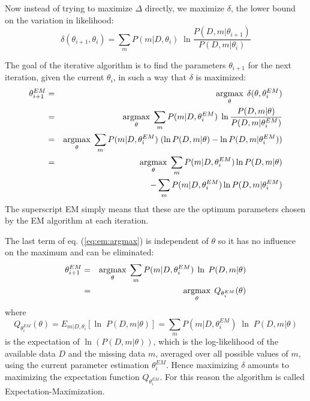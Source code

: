 Now instead of trying to maximize $\Delta$ directly, we maximize $\delta$, the lower bound on the variation in likelihood:
\begin{equation}
\delta(\theta_{i+1}, \theta_i) = \sum_m P(m|D, \theta_i) \; 
                           \ln \frac{P(D,m|\theta_{i+1})}{P(D,m|\theta_i)}
\label{eq:deltaEM}
\end{equation}

The goal of the iterative algorithm is to find the parameters $\theta_{i+1}$ for the next iteration, given the current $\theta_i$, in such a way that $\delta$ is maximized:
\begin{eqnarray}
\theta_{i+1}^{EM} & = & 
     \argmax_\theta \; \delta(\theta, \theta_i^{EM}) \nonumber \\
     & = & \argmax_\theta \; \sum_m P(m|D, \theta_i^{EM}) \; 
                           \ln \frac{P(D,m|\theta)}{P(D,m|\theta_i^{EM})}
\\
     & = & \argmax_\theta \; \sum_m P(m|D, \theta_i^{EM}) \; 
                           ( \ln P(D,m|\theta) - \ln P(D,m|\theta_i^{EM} ) )
\\
     & = & \argmax_\theta \; 
\sum_m P(m|D, \theta_i^{EM}) \ln P(D,m|\theta) 
\nonumber \\
&& \quad \quad \quad 
- \sum_m P(m|D, \theta_i^{EM}) \ln P(D,m|\theta_i^{EM})
\label{eq:em:argmax}
\end{eqnarray}
The superscript EM simply means that these are the optimum parameters chosen by the EM algorithm at each iteration.

The last term of eq. (\ref{eq:em:argmax}) is independent of $\theta$ so it has no influence on the maximum and can be eliminated:
\begin{eqnarray}
\theta_{i+1}^{EM} & = & 
   \argmax_\theta \; \sum_m P(m|D, \theta_i^{EM}) \; 
   \ln \; P(D,m|\theta) \nonumber \\
& = &
   \argmax_\theta \; Q_{\theta_i^{EM}}(\theta)
\label{eq:thetaEM}
\end{eqnarray}
%
where
%
\begin{equation}
Q_{\theta_i^{EM}}(\theta) = E_{m|D,\theta_i}[ \ln \; P(D,m|\theta) ]
= \sum_m P(m|D, \theta_i^{EM}) \; \ln \; P(D,m|\theta)
\label{eq:QEM}
\end{equation}
is the expectation of $\ln (P(D,m|\theta))$, which is the log-likelihood of the available data $D$ and the missing data $m$, averaged over all possible values of $m$, using the current parameter estimation $\theta_i^{EM}$. Hence maximizing $\delta$ amounts to maximizing the expectation function $Q_{\theta_i^{EM}}$. For this reason the algorithm is called Expectation-Maximization.

